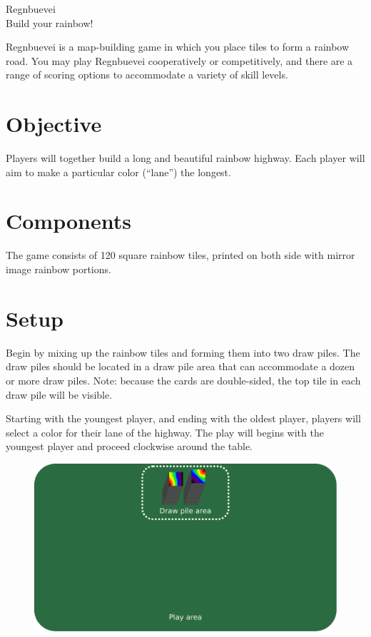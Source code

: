 \documentclass[twocolumn, 12pt]{article}
\begin{document}
\begin{center}
  \Large Regnbuevei\\
  Build your rainbow!
\end{center}
\noindent
Regnbuevei is a map-building game in which you place tiles to form a rainbow road.  You may play Regnbuevei cooperatively or competitively, and there are a range of scoring options to accommodate a variety of skill levels.

\section*{Objective}

Players will together build a long and beautiful rainbow highway.
Each player will aim to make a particular color (``lane'') the
longest.
\section*{Components}
The game consists of 120 square rainbow tiles, printed on both side with mirror image rainbow portions.

\section*{Setup}

Begin by mixing up the rainbow tiles and forming them into two draw
piles. The draw piles should be located in a draw pile area that can
accommodate a dozen or more draw piles.  Note: because the cards are
double-sided, the top tile in each draw pile will be visible.

Starting with the youngest player, and ending with the oldest player,
players will select a color for their lane of the highway.  The play
will begins with the youngest player and proceed clockwise around the
table.
\begin{figure}[h]
  \includegraphics[width=\columnwidth]{draw-piles}
\end{figure}
\end{document}
